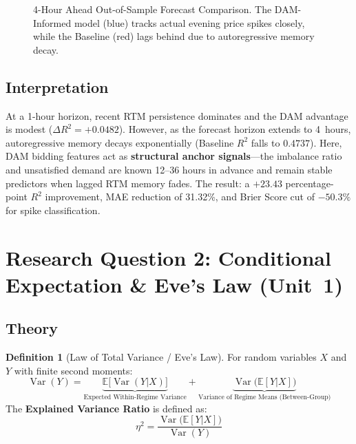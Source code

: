 \documentclass[12pt, a4paper]{article}
\theoremstyle{definition}
\newtheorem{definition}{Definition}[section]
\begin{document}
\begin{figure}[H]
    \centering
    \caption{4-Hour Ahead Out-of-Sample Forecast Comparison. The DAM-Informed model (blue) tracks actual evening price spikes closely, while the Baseline (red) lags behind due to autoregressive memory decay.}
    \label{fig:forecast}
\end{figure}

\subsection{Interpretation}

At a 1-hour horizon, recent RTM persistence dominates and the DAM advantage is modest ($\Delta R^2 = +0.0482$). However, as the forecast horizon extends to 4~hours, autoregressive memory decays exponentially (Baseline $R^2$ falls to $0.4737$). Here, DAM bidding features act as \textbf{structural anchor signals}---the imbalance ratio and unsatisfied demand are known 12--36 hours in advance and remain stable predictors when lagged RTM memory fades. The result: a $+23.43$ percentage-point $R^2$ improvement, MAE reduction of 31.32\%, and Brier Score cut of $-50.3\%$ for spike classification.

\section{Research Question 2: Conditional Expectation \& Eve's Law (Unit~1)}

\subsection{Theory}

\begin{definition}[Law of Total Variance / Eve's Law]
For random variables $X$ and $Y$ with finite second moments:
\begin{equation}
    \operatorname{Var}(Y) = \underbrace{\mathbb{E}\!\big[\operatorname{Var}(Y|X)\big]}_{\text{Expected Within-Regime Variance}} + \underbrace{\operatorname{Var}\!\big(\mathbb{E}[Y|X]\big)}_{\text{Variance of Regime Means (Between-Group)}}
    \label{eq:eves_law}
\end{equation}
The \textbf{Explained Variance Ratio} is defined as:
\begin{equation}
    \eta^2 = \frac{\operatorname{Var}\!\big(\mathbb{E}[Y|X]\big)}{\operatorname{Var}(Y)}
\end{equation}
\end{definition}
\end{document}
